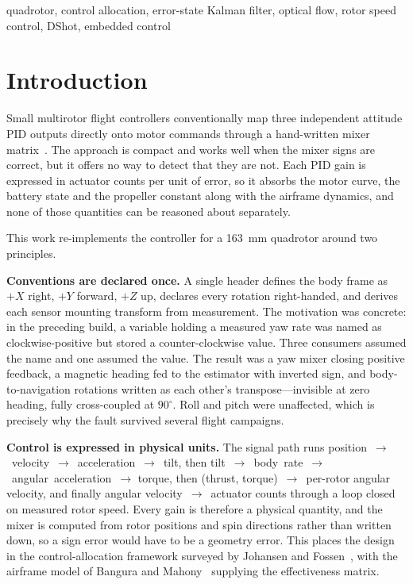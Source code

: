 \documentclass[conference]{IEEEtran}
\begin{document}
\begin{IEEEkeywords}
quadrotor, control allocation, error-state Kalman filter, optical flow,
rotor speed control, DShot, embedded control
\end{IEEEkeywords}

\section{Introduction}

Small multirotor flight controllers conventionally map three independent
attitude PID outputs directly onto motor commands through a hand-written mixer
matrix~\cite{bouabdallah2007,mahony2012}. The approach is compact and works
well when the mixer signs are correct, but it offers no way to detect that
they are not. Each PID gain is expressed in actuator counts per unit of error,
so it absorbs the motor curve, the battery state and the propeller constant
along with the airframe dynamics, and none of those quantities can be reasoned
about separately.

This work re-implements the controller for a 163~mm quadrotor around two
principles.

\textbf{Conventions are declared once.} A single header defines the body frame
as $+X$ right, $+Y$ forward, $+Z$ up, declares every rotation right-handed,
and derives each sensor mounting transform from measurement. The motivation
was concrete: in the preceding build, a variable holding a measured yaw rate
was named as clockwise-positive but stored a counter-clockwise value. Three
consumers assumed the name and one assumed the value. The result was a yaw
mixer closing positive feedback, a magnetic heading fed to the estimator with
inverted sign, and body-to-navigation rotations written as each other's
transpose---invisible at zero heading, fully cross-coupled at $90^{\circ}$.
Roll and pitch were unaffected, which is precisely why the fault survived
several flight campaigns.

\textbf{Control is expressed in physical units.} The signal path runs
position~$\rightarrow$~velocity~$\rightarrow$~acceleration~$\rightarrow$~tilt,
then tilt~$\rightarrow$~body~rate~$\rightarrow$~angular~acceleration~$\rightarrow$
torque, then (thrust, torque)~$\rightarrow$~per-rotor angular velocity, and
finally angular velocity~$\rightarrow$~actuator counts through a loop closed on
measured rotor speed. Every gain is therefore a physical quantity, and the
mixer is computed from rotor positions and spin directions rather than written
down, so a sign error would have to be a geometry error. This places the
design in the control-allocation framework surveyed by Johansen and
Fossen~\cite{johansen2013}, with the airframe model of Bangura and
Mahony~\cite{bangura2012} supplying the effectiveness matrix.
\end{document}
